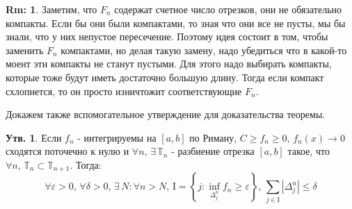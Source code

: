\documentclass[12pt]{article}
\newcommand{\MTB}{\mathbb{T}}
\newcommand{\MI}{\mathrm{I}}
\newcommand{\VE}{\varepsilon}
\theoremstyle{definition}
\newtheorem{rem}{Rm:}
\newtheorem{prop}{Утв.}
\begin{document}
\begin{rem}
	Заметим, что $F_n$ содержат счетное число отрезков, они не обязательно компакты. Если бы они были компактами, то зная что они все не пусты, мы бы знали, что у них непустое пересечение. Поэтому идея состоит в том, чтобы заменить $F_n$ компактами, но делая такую замену, надо убедиться что в какой-то моент эти компакты не станут пустыми. Для этого надо выбирать компакты, которые тоже будут иметь достаточно большую длину. Тогда если компакт схлопнется, то он просто изничтожит соответствующие $F_n$.
\end{rem}
Докажем также вспомогательное утверждение для доказательства теоремы.
\begin{prop}
	Если $f_n$ - интегрируемы на $[a,b]$ по Риману, $C \geq f_n \geq 0, \, f_n(x) \to 0$ сходятся поточечно к нулю и $\forall n, \, \exists \, \MTB_n$ - разбиение отрезка $[a,b]$ такое, что $\forall n , \, \MTB_n \subset \MTB_{n+1}$. Тогда:
	$$
		\forall \VE > 0, \, \forall \delta > 0, \, \exists \, N \colon \forall n > N, \, \MI = \left\{j \colon \inf\limits_{\Delta_j^n}f_n \geq \VE\right\}, \, \sum\limits_{j \in \MI} |\Delta_j^n| \leq \delta
	$$
\end{prop}
\end{document}
